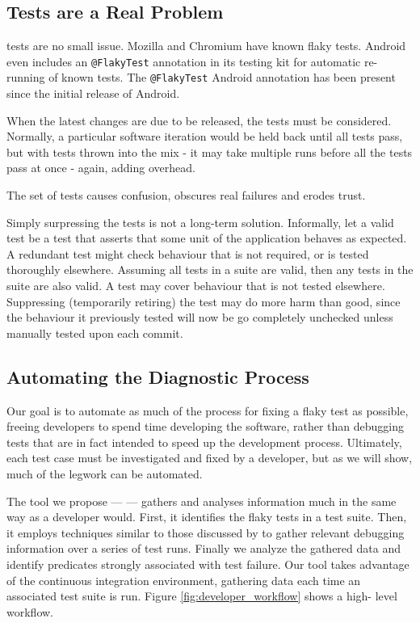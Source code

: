 \subsection{\Flaky Tests are a Real Problem}

\Flaky tests are no small issue. Mozilla\cite{mozillaFlakyTestBug} and Chromium
have known flaky tests. Android even includes an {\tt @FlakyTest}
annotation\cite{androidFlakyInterface} in its testing kit for automatic re-
running of known \flaky tests. The {\tt @FlakyTest} Android annotation has been
present since the initial release of Android.

When the latest changes are due to be released, the \flaky tests must be
considered. Normally, a particular software iteration would be held back until
all tests pass, but with \flaky tests thrown into the mix - it may take multiple
runs before all the tests pass at once - again, adding overhead.

The set of \flaky tests causes confusion, obscures real failures and erodes
trust.

Simply surpressing the \flaky tests is not a long-term solution. Informally, let
a valid test be a test that asserts that some unit of the application behaves as
expected. A redundant test might check behaviour that is not required, or is
tested thoroughly elsewhere. Assuming all tests in a suite are valid, then any
\flaky tests in the suite are also valid. A \flaky test may cover behaviour that
is not tested elsewhere. Suppressing (temporarily retiring) the \flaky test may
do more harm than good, since the behaviour it previously tested will now be go
completely unchecked unless manually tested upon each commit.

\subsection{Automating the Diagnostic Process}

Our goal is to automate as much of the process for fixing a flaky test as
possible, freeing developers to spend time developing the software, rather than
debugging tests that are in fact intended to speed up the development process.
Ultimately, each test case must be investigated and fixed by a developer, but as
we will show, much of the legwork can be automated.

The tool we propose --- \textit{\venera} --- gathers and analyses information
much in the same way as a developer would. First, it identifies the flaky tests
in a test suite. Then, it employs techniques similar to those discussed by
\citet{ArumugaNainar:2010:ABI:1806799.1806839} to gather relevant debugging
information over a series of test runs. Finally we analyze the gathered data and
identify predicates strongly associated with test failure. Our tool takes
advantage of the continuous integration environment, gathering data each time an
associated test suite is run. Figure \ref{fig:developer_workflow} shows a high-
level \venera workflow.

